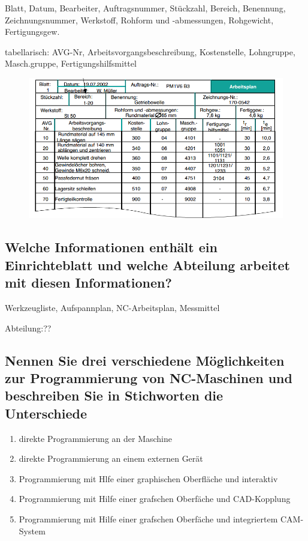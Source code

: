 Blatt, Datum, Bearbeiter, Auftragsnummer, Stückzahl, Bereich, Benennung,
Zeichnungsnummer, Werkstoff, Rohform und -abmessungen, Rohgewicht,
Fertigungsgew.

tabellarisch: AVG-Nr, Arbeitsvorgangsbeschreibung, Kostenstelle, Lohngruppe,
Masch.gruppe, Fertigungshilfsmittel

\begin{figure}[h]
    \centering
    \includegraphics[scale=0.7]{Bild2_3.png}
\end{figure}

\subsection*{%
    Welche Informationen enthält ein Einrichteblatt und welche Abteilung
    arbeitet mit diesen Informationen?
}

Werkzeugliste, Aufspannplan, NC-Arbeitsplan, Messmittel

Abteilung:??

\subsection*{%
    Nennen Sie drei verschiedene Möglichkeiten zur Programmierung von
    NC-Maschinen und beschreiben Sie in Stichworten die Unterschiede
}

\begin{enumerate}[1)]
    \item direkte Programmierung an der Maschine
    \item direkte Programmierung an einem externen Gerät
    \item Programmierung mit Hlfe einer graphischen Oberfläche und interaktiv
    \item Programmierung mit Hilfe einer grafschen Oberfäche und CAD-Kopplung
    \item
        Programmierung mit Hilfe einer grafschen Oberfäche und integriertem
        CAM-System
\end{enumerate}

